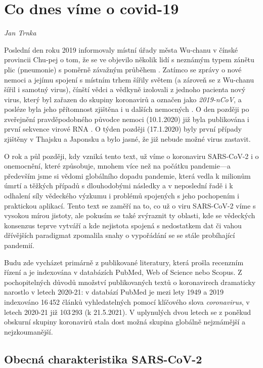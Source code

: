 \chapter{Co dnes víme o covid-19} \label{Co_se_vi}

\textit{Jan Trnka}
\vspace{15mm}

Poslední den roku 2019 informovaly místní úřady města Wu-chanu v čínské provincii Chu-pej o tom, že se ve objevilo několik lidí s neznámým typem zánětu plic (pneumonie) s poměrně závažným průběhem \cite{Gralinski:2020}. Zatímco se zprávy o nové nemoci a jejímu spojení s místním trhem šířily světem (a zároveň se z Wu-chanu šířil i samotný virus), čínští vědci a vědkyně izolovali z jednoho pacienta nový virus, který byl zařazen do skupiny koronavirů a označen jako \textit{2019-nCoV}, a posléze byla  jeho přítomnost zjištěna i u dalších nemocných \cite{WHO:2020a}. O den později po zveřejnění pravděpodobného původce nemoci (10.1.2020) již byla publikována i první sekvence virové RNA \cite{Zhang:2020a}. O týden později (17.1.2020) byly první případy zjištěny v Thajsku a Japonsku a bylo jasné, že již nebude možné virus zastavit.

O rok a půl později, kdy vzniká tento text, už víme o koronaviru SARS-CoV-2 i o onemocnění, které způsobuje, mnohem více než na počátku pandemie---a především jsme si vědomi globálního dopadu pandemie, která vedla k milionům úmrtí a těžkých případů s dlouhodobými následky a v neposlední řadě i k odhalení síly vědeckého výzkumu i problémů spojených s jeho pochopením i praktickou aplikací. Tento text se zaměří na to, co už o viru SARS-CoV-2 víme s vysokou mírou jistoty, ale pokusím se také zvýraznit ty oblasti, kde se vědeckých konsenzus teprve vytváří a kde nejistota spojená s nedostatkem dat či vahou dřívějších paradigmat zpomalila snahy o vypořádání se se stále probíhající pandemií.

Budu zde vycházet primárně z publikované literatury, která prošla recenzním řízení a je indexována v databázích PubMed, Web of Science nebo Scopus. Z pochopitelných důvodů množství publikovaných textů o koronavirech dramaticky narostlo v letech 2020-21: v databází PubMed je mezi lety 1949 a 2019 indexováno 16\,452 článků vyhledatelných pomocí klíčového slova \textit{coronavirus}, v letech 2020-21 již 103\,293 (k 21.5.2021). V uplynulých dvou letech se z poněkud obskurní skupiny koronavirů stala dost možná skupina globálně nejznámější a nejzkoumanější.

\section*{Obecná charakteristika SARS-CoV-2}

